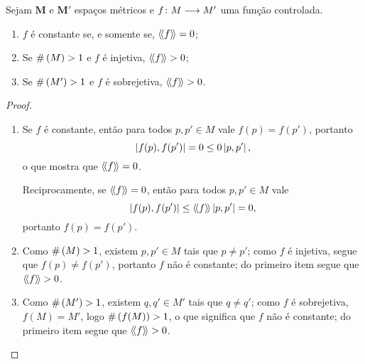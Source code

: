 \begin{proposition}
\label{prop:distorcao.injetiva.sobrejetiva}
Sejam $\bm M$ e $\bm M'$ espaços métricos e $f\colon \allowbreak M \longrightarrow M'$ uma função controlada.
	\begin{enumerate}
	\item $f$ é constante se, e somente se, $\langle\!\langle{f}\rangle\!\rangle = 0$;
	\item Se $\#\left({M}\right) > 1$ e $f$ é injetiva, $\langle\!\langle{f}\rangle\!\rangle > 0$;
	\item Se $\#\left({M'}\right) > 1$ e $f$ é sobrejetiva, $\langle\!\langle{f}\rangle\!\rangle > 0$.
	\end{enumerate}
\end{proposition}
\begin{proof}
	\begin{enumerate}
	\item Se $f$ é constante, então para todos $p,p' \in M$ vale $f(p)=f(p')$, portanto
		\begin{equation*}
		\left\vert{f(p)},{f(p')}\right\vert = 0 \leq 0 \left\vert{p},{p'}\right\vert,
		\end{equation*}
	o que mostra que $\langle\!\langle{f}\rangle\!\rangle = 0$.

	Reciprocamente, se $\langle\!\langle{f}\rangle\!\rangle=0$, então para todos $p,p' \in M$ vale
		\begin{equation*}
		\left\vert{f(p)},{f(p')}\right\vert \leq \langle\!\langle{f}\rangle\!\rangle\left\vert{p},{p'}\right\vert = 0,
		\end{equation*}
	portanto $f(p) = f(p')$.

	\item Como $\#\left({M}\right) > 1$, existem $p,p' \in M$ tais que $p \neq p'$; como $f$ é injetiva, segue que $f(p) \neq f(p')$, portanto $f$ não é constante; do primeiro item segue que $\langle\!\langle{f}\rangle\!\rangle > 0$.

	\item Como $\#\left({M'}\right) > 1$, existem $q,q' \in M'$ tais que $q \neq q'$; como $f$ é sobrejetiva, $f(M) = M'$, logo $\#\left({f(M)}\right) > 1$, o que significa que $f$ não é constante; do primeiro item segue que $\langle\!\langle{f}\rangle\!\rangle > 0$.
	\end{enumerate}
\end{proof}

